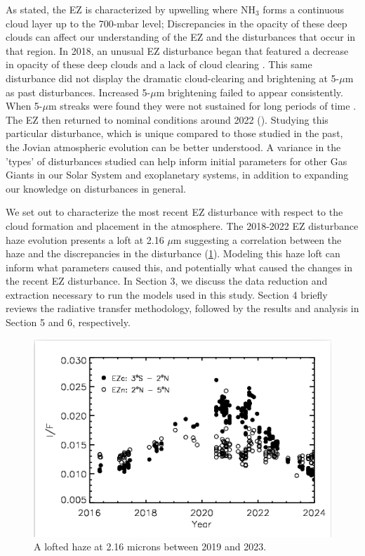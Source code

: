 \documentclass[a4paper,fleqn]{cas-dc}
\begin{document}
As stated, the EZ is characterized by upwelling where NH$_3$ forms a continuous cloud layer up to the 700-mbar level; Discrepancies in the opacity of these deep clouds can affect our understanding of the EZ and the disturbances that occur in that region. In 2018, an unusual EZ disturbance began that featured a decrease in opacity of these deep clouds and a lack of cloud clearing \cite{orton2019juno}. This same disturbance did not display the dramatic cloud-clearing and brightening at 5-$\mu$m as past disturbances. Increased 5-$\mu$m brightening failed to appear consistently. When 5-$\mu$m streaks were found they were not sustained for long periods of time \cite{orton2019juno}. The EZ then returned to nominal conditions around 2022 (\cite{2023DPS....5532605D}). Studying this particular disturbance, which is unique compared to those studied in the past, the Jovian atmospheric evolution can be better understood. A variance in the 'types' of disturbances studied can help inform initial parameters for other Gas Giants in our Solar System and exoplanetary systems, in addition to expanding our knowledge on disturbances in general.

We set out to characterize the most recent EZ disturbance with respect to the cloud formation and placement in the atmosphere. The 2018-2022 EZ disturbance haze evolution presents a loft at 2.16 $\mu$m suggesting a correlation between the haze and the discrepancies in the disturbance (\ref{fig:haze-evolution}). Modeling this haze loft can inform what parameters caused this, and potentially what caused the changes in the recent EZ disturbance. In Section 3, we discuss the data reduction and extraction necessary to run the models used in this study. Section 4 briefly reviews the radiative transfer methodology, followed by the results and analysis in Section 5 and 6, respectively. 

\begin{figure}
    \centering
    \includegraphics[width=1.0\linewidth]{haze_evolution.png}
    \caption{A lofted haze at 2.16 microns between 2019 and 2023.}
    \label{fig:haze-evolution}
\end{figure}
\end{document}
